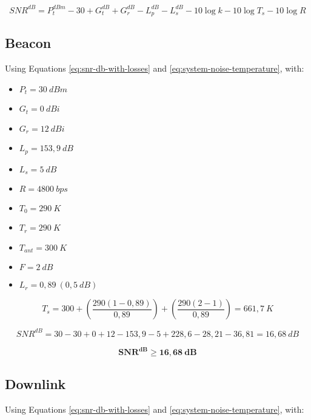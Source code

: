 \begin{equation} \label{eq:snr-db-with-losses}
    SNR^{dB} = P_{t}^{dBm} - 30 + G_{t}^{dB} + G_{r}^{dB} - L_{p}^{dB} - L_{s}^{dB} - 10\log k - 10\log T_{s} - 10\log R
\end{equation}

\subsection{Beacon}

Using Equations \ref{eq:snr-db-with-losses} and \ref{eq:system-noise-temperature}, with:

\begin{itemize}
    \item $P_{t} = 30\ dBm$
    \item $G_{t} = 0\ dBi$
    \item $G_{r} = 12\ dBi$
    \item $L_{p} = 153,9\ dB$
    \item $L_{s} = 5\ dB$
    \item $R = 4800\ bps$
    \item $T_{0} = 290\ K$
    \item $T_{r} = 290\ K$
    \item $T_{ant} = 300\ K$
    \item $F = 2\ dB$
    \item $L_{r} = 0,89\ (0,5\ dB)$
\end{itemize}

\begin{equation}
    T_{s} = 300 + \left( \frac{290 (1 - 0,89)}{0,89} \right) + \left( \frac{290 (2 - 1)}{0,89} \right) = 661,7\ K
\end{equation}

\begin{equation}
    SNR^{dB} = 30 - 30 + 0 + 12 - 153,9 - 5 + 228,6 - 28,21 - 36,81 = 16,68\ dB
\end{equation}

\begin{equation}
\mathbf{SNR^{dB} \geq 16,68\ dB}
\end{equation}

\subsection{Downlink}

Using Equations \ref{eq:snr-db-with-losses} and \ref{eq:system-noise-temperature}, with:

